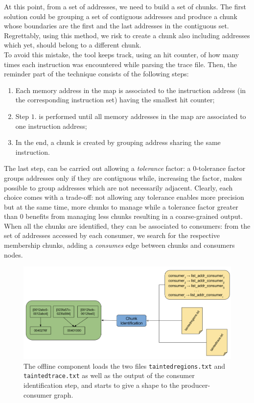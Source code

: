 \documentclass[LaM,binding=0.6cm]{sapthesis}
\begin{document}
At this point, from a set of addresses, we need to build a set of chunks. The first solution could be grouping a set of contiguous addresses and produce a chunk whose boundaries are the first and the last addresses in the contiguous set. Regrettably, using this method, we risk to create a chunk also including addresses which yet, should belong to a different chunk.\\
To avoid this mistake, the tool keeps track, using an hit counter, of how many times each instruction was encountered while parsing the trace file. Then, the reminder part of the technique consists of the following steps:
\begin{enumerate}
\item Each memory address in the map is associated to the instruction address (in the corresponding instruction set) having the smallest hit counter;
\item Step $1.$ is performed until all memory addresses in the map are associated to one instruction address;
\item In the end, a chunk is created by grouping address sharing the same instruction.
\end{enumerate} 
The last step, can be carried out allowing a \textit{tolerance} factor: a $0$-tolerance factor groups addresses only if they are contiguous while, increasing the factor, makes possible to group addresses which are not necessarily adjacent. Clearly, each choice comes with a trade-off: not allowing any tolerance enables more precision but at the same time, more chunks to manage while a tolerance factor greater than $0$ benefits from managing less chunks resulting in a coarse-grained output.\\

When all the chunks are identified, they can be associated to consumers: from the set of addresses accessed by each consumer, we search for the respective membership chunks, adding a \textit{consumes} edge between chunks and consumers nodes.

\begin{figure}[h!]
\centering
\includegraphics[scale=.45]{images/dtatracker5}
\vspace{-2mm}
\caption{The offline component loads the two files \texttt{taintedregions.txt} and \texttt{taintedtrace.txt} as well as the output of the consumer identification step, and starts to give a shape to the producer-consumer graph.}
\end{figure}
\end{document}
